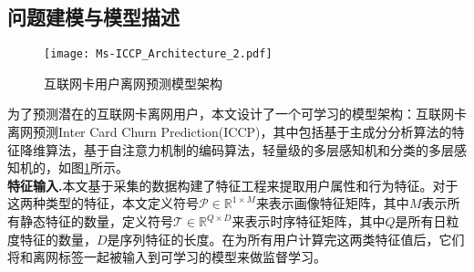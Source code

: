 
\subsection{问题建模与模型描述}
\begin{figure}[hbt]
	\centering
	\texttt{[image: Ms-ICCP\_Architecture\_2.pdf]}
	\caption{互联网卡用户离网预测模型架构}
	\label{Fig:ICCP-Architecture}
\end{figure}
为了预测潜在的互联网卡离网用户，本文设计了一个可学习的模型架构：互联网卡离网预测Inter Card Churn Prediction(ICCP)，其中包括基于主成分分析算法的特征降维算法，基于自注意力机制的编码算法，轻量级的多层感知机和分类的多层感知机的，如图\ref{Fig:ICCP-Architecture}所示。\\

\textbf{特征输入.}本文基于采集的数据构建了特征工程来提取用户属性和行为特征。对于这两种类型的特征，本文定义符号$\mathcal{P} \in \mathbb{R}^{1 \times M}$来表示画像特征矩阵，其中$M$表示所有静态特征的数量，定义符号$\mathcal{T} \in \mathbb{R}^{Q \times D}$来表示时序特征矩阵，其中$Q$是所有日粒度特征的数量，$D$是序列特征的长度。在为所有用户计算完这两类特征值后，它们将和离网标签一起被输入到可学习的模型来做监督学习。\\

